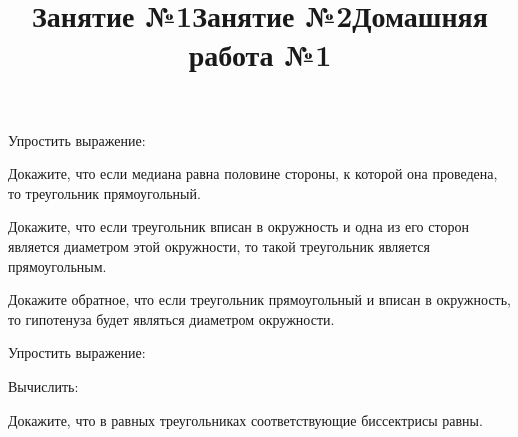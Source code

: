 \title{Занятие №1}
\begin{listofex}
	\item {}
	\item {}
	\item {}
	\item {}
	\item {}
	\item {}
	\item {}
	\item {}
	\item {}
	\item {}
\end{listofex}
\newpage
\title{Занятие №2}
\begin{listofex}
	\item Упростить выражение:
	\begin{enumcols}[itemcolumns=2]
		\item {}
		\item {}
	\end{enumcols}
	\item Докажите, что если медиана равна половине стороны, к которой она проведена, то треугольник прямоугольный.
	\item {}
	\item Докажите, что если треугольник вписан в окружность и одна из его сторон является диаметром этой окружности, то такой треугольник является прямоугольным.
	\item Докажите обратное, что если треугольник прямоугольный и вписан в окружность, то гипотенуза будет являться диаметром окружности.
	\item {}
	\item {}
	\item {}
\end{listofex}
\newpage
\title{Домашняя работа №1}
	\begin{listofex}
	\item Упростить выражение:
	\begin{enumcols}[itemcolumns=2]
		\item {}
		\item {}
	\end{enumcols}
	\item Вычислить:
	\begin{enumcols}[itemcolumns=2]
		\item {}
		\item {}
	\end{enumcols}
	\item Докажите, что в равных треугольниках соответствующие биссектрисы равны.
	\item {}
	\item {}
	\item {}
\end{listofex}
